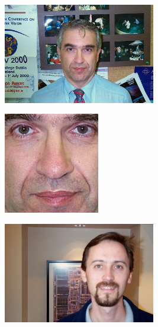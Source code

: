 
\begin{figure}[H]
\centering

\begin{subfigure}{0.65\textwidth}
\begin{subfigure}{.33\textwidth}
  \centering
  \includegraphics[width=0.95\textwidth]{img/fdResult1/input63.png}
  \caption{}
\end{subfigure}%
\begin{subfigure}{.33\textwidth}
  \centering
  \includegraphics[width=0.6\textwidth]{img/fdResult1/output63.png}
  \caption{}
\end{subfigure}%
\end{subfigure}%
\begin{subfigure}{0.65\textwidth}
\begin{subfigure}{.33\textwidth}
  \centering
  \includegraphics[width=0.95\textwidth]{img/fdResult1/input18.png}

\end{subfigure}
\end{subfigure}
\end{figure}
